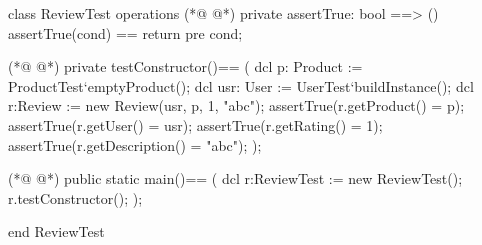 \begin{vdmpp}[breaklines=true]
class ReviewTest
 operations
(*@
\label{assertTrue:3}
@*)
  private assertTrue: bool ==> ()
    assertTrue(cond) == return
    pre cond;
    
(*@
\label{testConstructor:7}
@*)
  private testConstructor()==
  (
   dcl p: Product := ProductTest`emptyProduct();
   dcl usr: User := UserTest`buildInstance();
   dcl r:Review := new Review(usr, p, 1, "abc");
   assertTrue(r.getProduct() = p);
   assertTrue(r.getUser() = usr);
   assertTrue(r.getRating() = 1);
   assertTrue(r.getDescription() = "abc");
  );
  
(*@
\label{main:18}
@*)
  public static main()==
    (
   dcl r:ReviewTest := new ReviewTest();
   r.testConstructor();
    );
  
end ReviewTest
\end{vdmpp}
